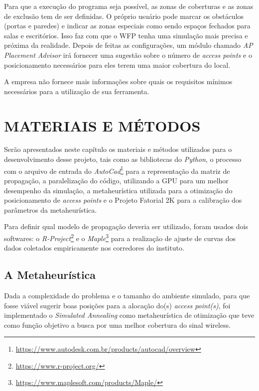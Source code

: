 \documentclass[
	12pt,				%
	openright,			%
	twoside,			%
	a4paper,			%
	english,			%
	french,				%
	spanish,			%
	brazil				%
	]{abntex2}
\begin{document}
Para que a execução do programa seja possível, as zonas de coberturas e as zonas de exclusão tem de ser definidas. O próprio usuário pode marcar os obstáculos (portas e paredes) e indicar as zonas especiais como sendo espaços fechados para salas e escritórios. Isso faz com que o WFP tenha uma simulação mais precisa e próxima da realidade. Depois de feitas as configurações, um módulo chamado \textit{AP Placement Advisor} irá fornecer uma sugestão sobre o número de \textit{access points} e o posicionamento necessários para eles terem uma maior cobertura do local.

A empresa não fornece mais informações sobre quais os requisitos mínimos necessários para a utilização de sua ferramenta. 


\chapter[MATERIAIS E MÉTODOS]{MATERIAIS E MÉTODOS}

Serão apresentados neste capítulo os materiais e métodos utilizados para o desenvolvimento desse projeto, tais como as bibliotecas do \textit{Python}, o processo com o arquivo de entrada do \textit{AutoCad}\footnote{\url{https://www.autodesk.com.br/products/autocad/overview}} para a representação da matriz de propagação, a paralelização do código, utilizando a GPU para um melhor desempenho da simulação, a metaheurística utilizada para a otimização do posicionamento de \textit{access points} e o Projeto Fatorial 2K para a calibração dos parâmetros da metaheurística.

Para definir qual modelo de propagação deveria ser utilizado, foram usados dois softwares: o \textit{R-Project}\footnote{\url{https://www.r-project.org/}} e o \textit{Maple}\footnote{\url{https://www.maplesoft.com/products/Maple/}} para a realização de ajuste de curvas dos dados coletados empiricamente nos corredores do instituto. 

\section[A Metaheurística]{A Metaheurística}

Dada a complexidade do problema e o tamanho do ambiente simulado, para que fosse viável sugerir boas posições para a alocação do(s) \textit{access point(s)}, foi implementado o \textit{Simulated Annealing} como metaheurística de otimização que teve como função objetivo a busca por uma melhor cobertura do sinal wireless. 
\end{document}

